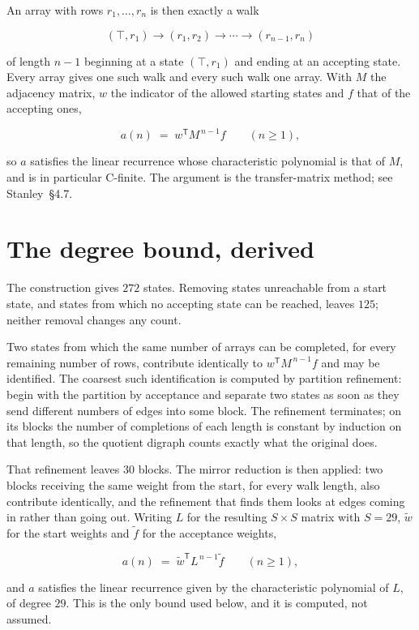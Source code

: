 \documentclass[11pt]{article}
\theoremstyle{definition}
\begin{document}
An array with rows $r_1,\dots,r_n$ is then exactly a walk

\[(\top,r_1) \to (r_1,r_2) \to \cdots \to (r_{n-1},r_n)\]

of length $n-1$ beginning at a state $(\top,r_1)$ and ending at an accepting state. Every array gives one such walk and every such walk one array. With $M$ the adjacency matrix, $w$ the indicator of the allowed starting states and $f$ that of the accepting ones,

\[a(n) \;=\; w^{\mathsf T} M^{\,n-1} f \qquad (n \ge 1),\]

so $a$ satisfies the linear recurrence whose characteristic polynomial is that of $M$, and is in particular C-finite. The argument is the transfer-matrix method; see Stanley~\S4.7.

\section{The degree bound, derived}

The construction gives $272$ states. Removing states unreachable from a start state, and states from which no accepting state can be reached, leaves $125$; neither removal changes any count.

Two states from which the same number of arrays can be completed, for every remaining number of rows, contribute identically to $w^{\mathsf T}M^{\,n-1}f$ and may be identified. The coarsest such identification is computed by partition refinement: begin with the partition by acceptance and separate two states as soon as they send different numbers of edges into some block. The refinement terminates; on its blocks the number of completions of each length is constant by induction on that length, so the quotient digraph counts exactly what the original does.

That refinement leaves $30$ blocks. The mirror reduction is then applied: two blocks receiving the same weight from the start, for every walk length, also contribute identically, and the refinement that finds them looks at edges coming in rather than going out. Writing $L$ for the resulting $S \times S$ matrix with $S = 29$, $\tilde w$ for the start weights and $\tilde f$ for the acceptance weights,

\[a(n) \;=\; \tilde w^{\mathsf T} L^{\,n-1} \tilde f \qquad (n \ge 1),\]

and $a$ satisfies the linear recurrence given by the characteristic polynomial of $L$, of degree $29$. This is the only bound used below, and it is computed, not assumed.
\end{document}
